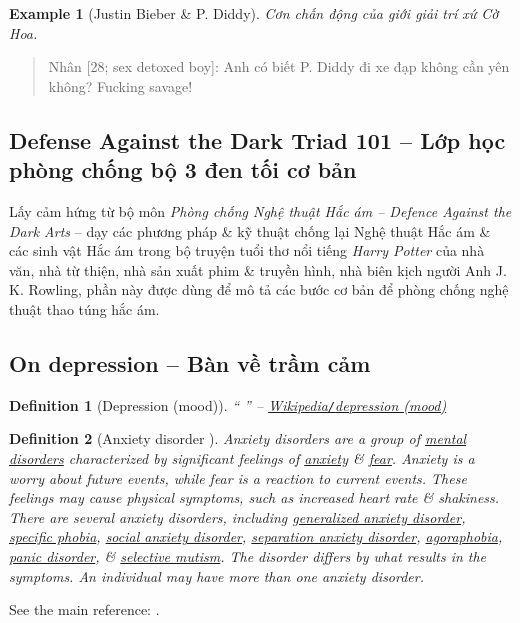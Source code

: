 \documentclass[12pt]{article}
\newtheorem{definition}{Definition}[section]
\newtheorem{example}{Example}
\begin{document}
\begin{example}[{\sc Justin Bieber} \& P. Diddy]
	Cơn chấn động của giới giải trí xứ Cờ Hoa.
\end{example}

\begin{quote}
	{\sf Nhân [28; sex detoxed boy]}: Anh có biết P. Diddy đi xe đạp không cần yên không? Fucking savage!
\end{quote}


\subsection{Defense Against the Dark Triad 101 -- Lớp học phòng chống bộ 3 đen tối cơ bản}
Lấy cảm hứng từ bộ môn {\it Phòng chống Nghệ thuật Hắc ám -- Defence Against the Dark Arts} -- dạy các phương pháp \& kỹ thuật chống lại Nghệ thuật Hắc ám \& các sinh vật Hắc ám trong bộ truyện tuổi thơ nổi tiếng {\it Harry Potter} của nhà văn, nhà từ thiện, nhà sản xuất phim \& truyền hình, nhà biên kịch người Anh {\sc J. K. Rowling}, phần này được dùng để mô tả các bước cơ bản để phòng chống nghệ thuật thao túng hắc ám.


\subsection{On depression -- Bàn về trầm cảm}

\begin{definition}[Depression (mood)]
	`` '' -- \href{https://en.wikipedia.org/wiki/Depression_(mood)}{Wikipedia{\tt/}depression (mood)}
\end{definition}

\begin{definition}[Anxiety disorder \cite{Wikipedia/Anxiety disorder}]
	\emph{Anxiety disorders} are a group of \href{https://en.wikipedia.org/wiki/Mental_disorder}{mental disorders} characterized by significant feelings of \href{https://en.wikipedia.org/wiki/Anxiety_(mood)}{anxiety} \& \href{https://en.wikipedia.org/wiki/Fear}{fear}. Anxiety is a worry about future events, while fear is a reaction to current events. These feelings may cause physical symptoms, such as increased heart rate \& shakiness. There are several anxiety disorders, including \href{https://en.wikipedia.org/wiki/Generalized_anxiety_disorder}{generalized anxiety disorder}, \href{https://en.wikipedia.org/wiki/Specific_phobia}{specific phobia}, \href{https://en.wikipedia.org/wiki/Social_anxiety_disorder}{social anxiety disorder}, \href{https://en.wikipedia.org/wiki/Separation_anxiety_disorder}{separation anxiety disorder}, \href{https://en.wikipedia.org/wiki/Agoraphobia}{agoraphobia}, \href{https://en.wikipedia.org/wiki/Panic_disorder}{panic disorder}, \& \href{https://en.wikipedia.org/wiki/Selective_mutism}{selective mutism}. The disorder differs by what results in the symptoms. An individual may have more than one anxiety disorder.
\end{definition}
See the main reference: \cite{APA2013}.
\end{document}
